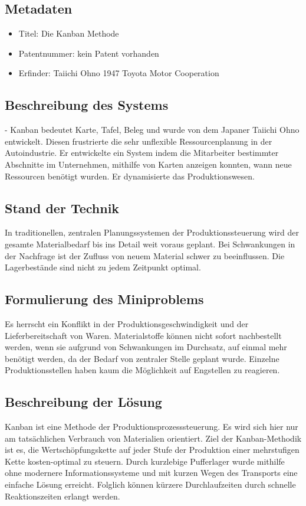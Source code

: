 \documentclass{article}
\begin{document}
\subsection{Metadaten}
\begin{itemize}\itemsep0pt
\item Titel: Die Kanban Methode
\item Patentnummer: kein Patent vorhanden
\item Erfinder:  Taiichi Ohno 1947 Toyota Motor Cooperation

\end{itemize}
\subsection{Beschreibung des Systems}
- Kanban bedeutet Karte, Tafel, Beleg und wurde von dem Japaner Taiichi Ohno entwickelt. Diesen frustrierte die sehr unflexible Ressourcenplanung in der Autoindustrie. Er entwickelte ein System indem die Mitarbeiter bestimmter Abschnitte im Unternehmen, mithilfe von Karten anzeigen konnten, wann neue Ressourcen benötigt wurden. Er dynamisierte das Produktionswesen.
\subsection{Stand der Technik}
In traditionellen, zentralen Planungssystemen der Produktionssteuerung wird der gesamte Materialbedarf bis ins Detail weit voraus geplant. Bei Schwankungen in der Nachfrage ist der Zufluss von neuem Material schwer zu beeinflussen. Die Lagerbestände sind nicht zu jedem Zeitpunkt optimal.

\subsection{Formulierung des Miniproblems}
Es herrscht ein Konflikt in der Produktionsgeschwindigkeit und der Lieferbereitschaft von Waren.
Materialstoffe können nicht sofort nachbestellt werden, wenn sie aufgrund von Schwankungen im Durchsatz, auf einmal mehr benötigt werden, da der Bedarf von zentraler Stelle geplant wurde. Einzelne Produktionsstellen haben kaum die Möglichkeit auf Engstellen zu reagieren.
\subsection{Beschreibung der Lösung}

Kanban ist eine Methode der Produktionsprozesssteuerung. Es wird sich hier nur am tatsächlichen Verbrauch von Materialien orientiert. Ziel der Kanban-Methodik ist es, die Wertschöpfungskette auf jeder Stufe der Produktion einer mehrstufigen Kette kosten-optimal zu steuern. Durch kurzlebige Pufferlager wurde mithilfe ohne modernere Informationssysteme und mit kurzen Wegen des Transports eine einfache Lösung erreicht.
Folglich können kürzere Durchlaufzeiten durch schnelle Reaktionszeiten erlangt werden. 
\end{document}
